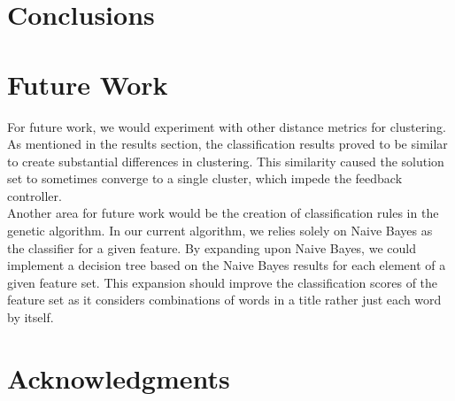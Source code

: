 \documentclass{sig-alternate}
\begin{document}
\section{Conclusions}

\section{Future Work}
For future work, we would experiment with other distance metrics for clustering. As mentioned in the results section, the classification results proved to be similar to create substantial differences in clustering. This similarity caused the solution set to sometimes converge to a single cluster, which impede the feedback controller.\\
\indent Another area for future work would be the creation of classification rules in the genetic algorithm. In our current algorithm, we relies solely on Naive Bayes as the classifier for a given feature. By expanding upon Naive Bayes, we could implement a decision tree based on the Naive Bayes results for each element of a given feature set. This expansion should improve the classification scores of the feature set as it considers combinations of words in a title rather just each word by itself.

\section{Acknowledgments}



\end{document}
